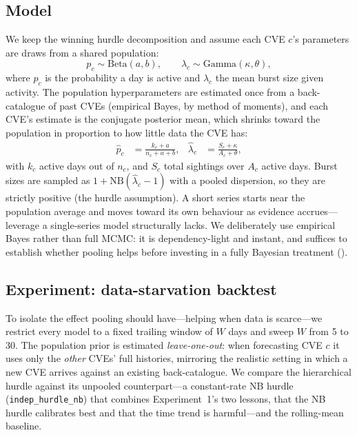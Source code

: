 \documentclass[]{article}
\begin{document}
\subsection{Model}
We keep the winning hurdle decomposition and assume each CVE $c$'s parameters are
draws from a shared population:
\begin{equation}
  p_c \sim \mathrm{Beta}(a,b), \qquad \lambda_c \sim \mathrm{Gamma}(\kappa,\theta),
\end{equation}
where $p_c$ is the probability a day is active and $\lambda_c$ the mean burst size
given activity. The population hyperparameters are estimated once from a
back-catalogue of past CVEs (empirical Bayes, by method of moments), and each CVE's
estimate is the conjugate posterior mean, which shrinks toward the population in
proportion to how little data the CVE has:
\begin{align}
  \hat p_c &= \frac{k_c + a}{n_c + a + b}, &
  \hat \lambda_c &= \frac{S_c + \kappa}{A_c + \theta},
\end{align}
with $k_c$ active days out of $n_c$, and $S_c$ total sightings over $A_c$ active
days. Burst sizes are sampled as $1+\mathrm{NB}(\hat\lambda_c-1)$ with a pooled
dispersion, so they are strictly positive (the hurdle assumption). A short series
starts near the population average and moves toward its own behaviour as evidence
accrues---leverage a single-series model structurally lacks. We deliberately use
empirical Bayes rather than full MCMC: it is dependency-light and instant, and
suffices to establish whether pooling helps before investing in a fully Bayesian
treatment ().

\subsection{Experiment: data-starvation backtest}
To isolate the effect pooling should have---helping when data is scarce---we
restrict every model to a fixed trailing window of $W$ days and sweep $W$ from 5 to
30. The population prior is estimated \emph{leave-one-out}: when forecasting CVE
$c$ it uses only the \emph{other} CVEs' full histories, mirroring the realistic
setting in which a new CVE arrives against an existing back-catalogue. We compare the
hierarchical hurdle against its unpooled counterpart---a constant-rate NB hurdle
(\texttt{indep\_hurdle\_nb}) that combines Experiment~1's two lessons, that the NB
hurdle calibrates best and that the time trend is harmful---and the rolling-mean
baseline.
\end{document}
